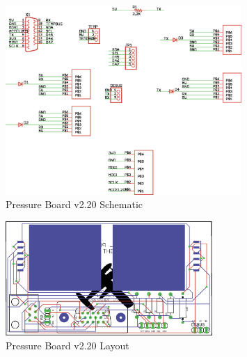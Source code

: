 \begin{figure}[H]
  \caption{Pressure Board v2.20 Schematic} \label{fig:satelliteSchematic}
  \centering
    \includegraphics[width=0.8\textwidth]{figures/satellitev2Sch.eps}
\end{figure}

\begin{figure}[H]
  \caption{Pressure Board v2.20 Layout} \label{fig:satelliteBrd}
  \centering
    \includegraphics[width=0.7\textwidth]{figures/satellitev2Brd.eps}
\end{figure}

